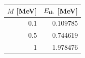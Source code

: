 \begin{tabular}{rr}\toprule $M$ [MeV] & $E_{\rm th}$ [MeV]\\\midrule
0.1 & 0.109785\\
0.5 & 0.744619\\
1 & 1.978476\\
\bottomrule\end{tabular}
